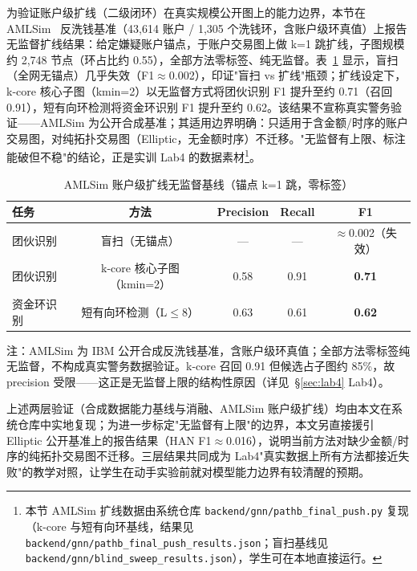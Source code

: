 \documentclass[12pt,a4paper]{ctexart}
\begin{document}
为验证账户级扩线（二级闭环）在真实规模公开图上的能力边界，本节在 AMLSim~\cite{weber2018amlfirstlook} 反洗钱基准（43,614 账户 / 1,305 个洗钱环，含账户级环真值）上报告无监督扩线结果：给定嫌疑账户锚点，于账户交易图上做 k=1 跳扩线，子图规模约 2,748 节点（环占比约 0.55），全部方法零标签、纯无监督。表~\ref{tab:amlsim} 显示，盲扫（全网无锚点）几乎失效（F1$\approx$0.002），印证"盲扫 vs 扩线"瓶颈；扩线设定下，k-core 核心子图（kmin=2）以无监督方式将团伙识别 F1 提升至约 0.71（召回 0.91），短有向环检测将资金环识别 F1 提升至约 0.62。该结果不宣称真实警务验证——AMLSim 为公开合成基准；其适用边界明确：只适用于含金额/时序的账户交易图，对纯拓扑交易图（Elliptic，无金额时序）不迁移。"无监督有上限、标注能破但不稳"的结论，正是实训 Lab4 的数据素材\footnote{本节 AMLSim 扩线数据由系统仓库 \texttt{backend/gnn/pathb\_final\_push.py} 复现（k-core 与短有向环基线，结果见 \texttt{backend/gnn/pathb\_final\_push\_results.json}；盲扫基线见 \texttt{backend/gnn/blind\_sweep\_results.json}），学生可在本地直接运行。}。

\begin{table}[htbp]
  \centering
  \caption{AMLSim 账户级扩线无监督基线（锚点 k=1 跳，零标签）}
  \label{tab:amlsim}
  \begin{tabular}{lcccc}
    \toprule
    任务 & 方法 & Precision & Recall & F1 \\
    \midrule
    团伙识别 & 盲扫（无锚点） & — & — & $\approx$0.002（失效） \\
    团伙识别 & k-core 核心子图（kmin=2） & 0.58 & 0.91 & \textbf{0.71} \\
    资金环识别 & 短有向环检测（L$\le$8） & 0.63 & 0.61 & \textbf{0.62} \\
    \bottomrule
  \end{tabular}
  \par\vspace{1.5\baselineskip}
  \begin{minipage}{\textwidth}
  \footnotesize
  \noindent 注：AMLSim 为 IBM 公开合成反洗钱基准，含账户级环真值；全部方法零标签纯无监督，不构成真实警务数据验证。k-core 召回 0.91 但候选占子图约 85\%，故 precision 受限——这正是无监督上限的结构性原因（详见~\S\ref{sec:lab4} Lab4）。
  \end{minipage}
\end{table}

上述两层验证（合成数据能力基线与消融、AMLSim 账户级扩线）均由本文在系统仓库中实地复现；为进一步标定"无监督有上限"的边界，本文另直接援引 Elliptic 公开基准上的报告结果（HAN F1$\approx$0.016），说明当前方法对缺少金额/时序的纯拓扑交易图不迁移。三层结果共同成为 Lab4"真实数据上所有方法都接近失败"的教学对照，让学生在动手实验前就对模型能力边界有较清醒的预期。
\end{document}
